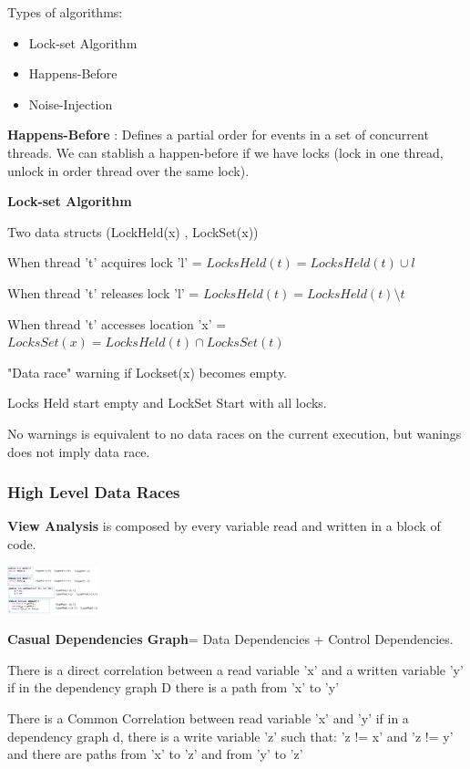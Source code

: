 Types of algorithms:

\begin{itemize}
    \item Lock-set Algorithm
    \item Happens-Before
    \item Noise-Injection
\end{itemize}

\textbf{Happens-Before} : Defines a partial order for events in a set of concurrent threads. We can stablish a happen-before if we have locks (lock in one thread, unlock in order thread over the same lock).

\textbf{Lock-set Algorithm}\par
Two data structs (LockHeld(x) , LockSet(x)) \par
When thread 't' acquires lock 'l' = $LocksHeld(t) = LocksHeld(t) \cup {l}$ \par
When thread 't' releases lock 'l' = $LocksHeld(t) = LocksHeld(t) \setminus {t}$\par
When thread 't' accesses location 'x' = $LocksSet(x) = LocksHeld(t) \cap LocksSet(t)$\par
"Data race" warning if Lockset(x) becomes empty. \par
Locks Held start empty and LockSet Start with all locks.\par
No warnings is equivalent to no data races on the current execution, but wanings does not imply data race.\par


\subsubsection{High Level Data Races}

\textbf{View Analysis} is composed by every variable read and written in a block of code.

\includegraphics[width=0.20\textwidth]{concurrency-errors/view.png}

\textbf{Casual Dependencies Graph}= Data Dependencies + Control Dependencies.\par

There is a direct correlation between a read variable 'x' and a written variable 'y' if in the dependency graph D there is a path from 'x' to 'y'\par
There is a Common Correlation between read variable 'x' and 'y' if in a dependency graph d, there is a write variable 'z' such that: 'z != x' and 'z != y' and there are paths from 'x' to 'z' and from 'y' to 'z'

